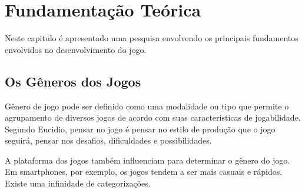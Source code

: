 \chapter{Fundamentação Teórica}
\label{cap:fundamentacao-teorica}

Neste capitulo é apresentado uma pesquisa envolvendo os principais fundamentos envolvidos no desenvolvimento do jogo.

\section{Os Gêneros dos Jogos}
\label{sec:os-generos-dos-jogos}

Gênero de jogo pode ser definido como uma modalidade ou tipo que permite o agrupamento de diversos jogos de acordo com suas características de jogabilidade.
Segundo Eucidio, pensar no jogo é pensar no estilo de produção que o jogo seguirá, pensar nos desafios, dificuldades e possibilidades. \cite{euc}

A plataforma dos jogos também influenciam para determinar o gênero do jogo. Em smartphones, por exemplo, os jogos tendem a ser mais casuais e rápidos. Existe uma infinidade de categorizações. \cite{gen}

